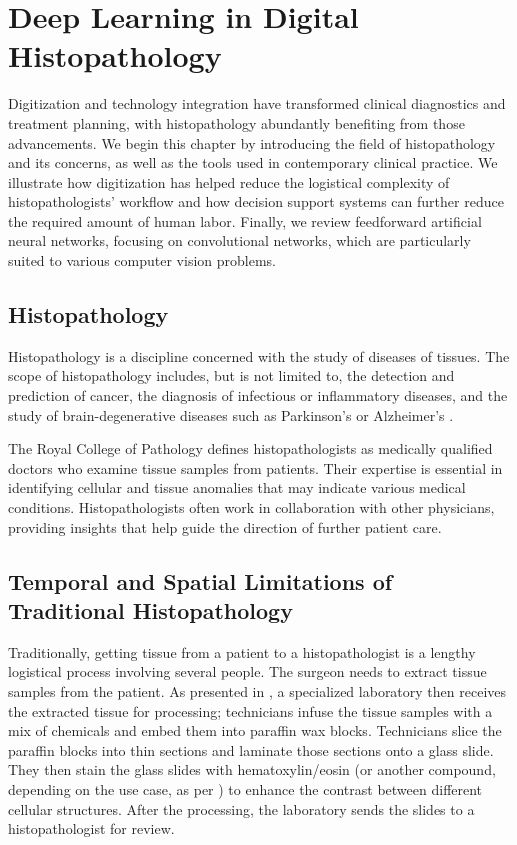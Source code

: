 \chapter{Deep Learning in Digital Histopathology}

Digitization and technology integration have transformed clinical diagnostics and treatment planning, with histopathology abundantly benefiting from those advancements.
We begin this chapter by introducing the field of histopathology and its concerns, as well as the tools used in contemporary clinical practice.
We illustrate how digitization has helped reduce the logistical complexity of histopathologists' workflow and how decision support systems can further reduce the required amount of human labor.
Finally, we review feedforward artificial neural networks, focusing on convolutional networks, which are particularly suited to various computer vision problems.

\section{Histopathology}

Histopathology is a discipline concerned with the study of diseases of tissues.
The scope of histopathology includes, but is not limited to, the detection and prediction of cancer, the diagnosis of infectious or inflammatory diseases, and the study of brain-degenerative diseases such as Parkinson's or Alzheimer's \cite{histopathology-cancer, histopathology-infectious, histopathology-inflammatory, histopathology-brain-degenerative}.

The Royal College of Pathology \cite{histopathologist-role} defines histopathologists as medically qualified doctors who examine tissue samples from patients.
Their expertise is essential in identifying cellular and tissue anomalies that may indicate various medical conditions.
Histopathologists often work in collaboration with other physicians, providing insights that help guide the direction of further patient care.

\section{Temporal and Spatial Limitations of Traditional Histopathology}

Traditionally, getting tissue from a patient to a histopathologist is a lengthy logistical process involving several people.
The surgeon needs to extract tissue samples from the patient.
As presented in \cite{histo-process}, a specialized laboratory then receives the extracted tissue for processing; technicians infuse the tissue samples with a mix of chemicals and embed them into paraffin wax blocks.
Technicians slice the paraffin blocks into thin sections and laminate those sections onto a glass slide.
They then stain the glass slides with hematoxylin/eosin (or another compound, depending on the use case, as per \cite{histopathology-staining}) to enhance the contrast between different cellular structures.
After the processing, the laboratory sends the slides to a histopathologist for review.


